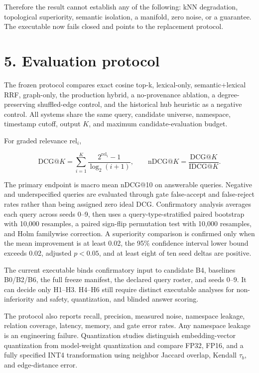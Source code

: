 \documentclass[
  english,
  11pt,
]{article}
\begin{document}
Therefore the result cannot establish any of the following: kNN
degradation, topological superiority, semantic isolation, a manifold,
zero noise, or a guarantee. The executable now fails closed and points
to the replacement protocol.

\section{5. Evaluation protocol}\label{evaluation-protocol}

The frozen protocol compares exact cosine top-k, lexical-only,
semantic+lexical RRF, graph-only, the production hybrid, a no-provenance
ablation, a degree-preserving shuffled-edge control, and the historical
hub heuristic as a negative control. All systems share the same query,
candidate universe, namespace, timestamp cutoff, output \(K\), and
maximum candidate-evaluation budget.

For graded relevance \(\mathrm{rel}_i\),

\[\mathrm{DCG}@K=\sum_{i=1}^{K}\frac{2^{\mathrm{rel}_i}-1}{\log_2(i+1)},\qquad
\mathrm{nDCG}@K=\frac{\mathrm{DCG}@K}{\mathrm{IDCG}@K}.\]

The primary endpoint is macro mean nDCG@10 on answerable queries.
Negative and underspecified queries are evaluated through gate
false-accept and false-reject rates rather than being assigned zero
ideal DCG. Confirmatory analysis averages each query across seeds 0--9,
then uses a query-type-stratified paired bootstrap with 10,000
resamples, a paired sign-flip permutation test with 10,000 resamples,
and Holm familywise correction. A superiority comparison is confirmed
only when the mean improvement is at least 0.02, the 95\% confidence
interval lower bound exceeds 0.02, adjusted \(p<0.05\), and at least
eight of ten seed deltas are positive.

The current executable binds confirmatory input to candidate B4,
baselines B0/B2/B6, the full freeze manifest, the declared query roster,
and seeds 0--9. It can decide only H1--H3. H4--H6 still require distinct
executable analyses for non-inferiority and safety, quantization, and
blinded answer scoring.

The protocol also reports recall, precision, measured noise, namespace
leakage, relation coverage, latency, memory, and gate error rates. Any
namespace leakage is an engineering failure. Quantization studies
distinguish embedding-vector quantization from model-weight quantization
and compare FP32, FP16, and a fully specified INT4 transformation using
neighbor Jaccard overlap, Kendall \(\tau_b\), and edge-distance error.
\end{document}
